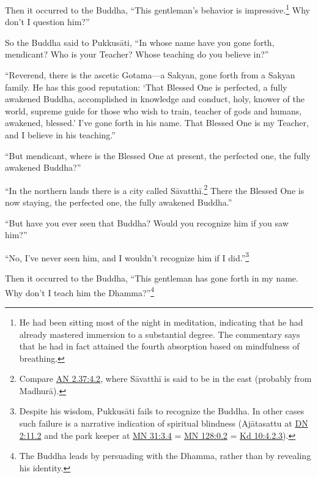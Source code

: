 \documentclass[12pt,openany]{book}%
\begin{document}
Then it occurred to the Buddha, “This gentleman’s behavior is impressive.\footnote{He had been sitting most of the night in meditation, indicating that he had already mastered immersion to a substantial degree. The commentary says that he had in fact attained the fourth absorption based on mindfulness of breathing. } Why don’t I question him?” 

So the Buddha said to \textsanskrit{Pukkusāti}, “In whose name have you gone forth, mendicant? Who is your Teacher? Whose teaching do you believe in?” 

“Reverend, there is the ascetic Gotama—a Sakyan, gone forth from a Sakyan family. He has this good reputation: ‘That Blessed One is perfected, a fully awakened Buddha, accomplished in knowledge and conduct, holy, knower of the world, supreme guide for those who wish to train, teacher of gods and humans, awakened, blessed.’ I’ve gone forth in his name. That Blessed One is my Teacher, and I believe in his teaching.” 

“But mendicant, where is the Blessed One at present, the perfected one, the fully awakened Buddha?” 

“In the northern lands there is a city called \textsanskrit{Sāvatthī}.\footnote{Compare \href{https://suttacentral.net/an2.37/en/sujato\#4.2}{AN 2.37:4.2}, where \textsanskrit{Sāvatthī} is said to be in the east (probably from \textsanskrit{Madhurā}). } There the Blessed One is now staying, the perfected one, the fully awakened Buddha.” 

“But have you ever seen that Buddha? Would you recognize him if you saw him?” 

“No, I’ve never seen him, and I wouldn’t recognize him if I did.”\footnote{Despite his wisdom, \textsanskrit{Pukkusāti} fails to recognize the Buddha. In other cases such failure is a narrative indication of spiritual blindness (\textsanskrit{Ajātasattu} at \href{https://suttacentral.net/dn2/en/sujato\#11.2}{DN 2:11.2} and the park keeper at \href{https://suttacentral.net/mn31/en/sujato\#3.4}{MN 31:3.4} = \href{https://suttacentral.net/mn128/en/sujato\#0.2}{MN 128:0.2} = \href{https://suttacentral.net/pli-tv-kd10/en/sujato\#4.2.3}{Kd 10:4.2.3}). } 

Then it occurred to the Buddha, “This gentleman has gone forth in my name. Why don’t I teach him the Dhamma?”\footnote{The Buddha leads by persuading with the Dhamma, rather than by revealing his identity. } 
\end{document}
